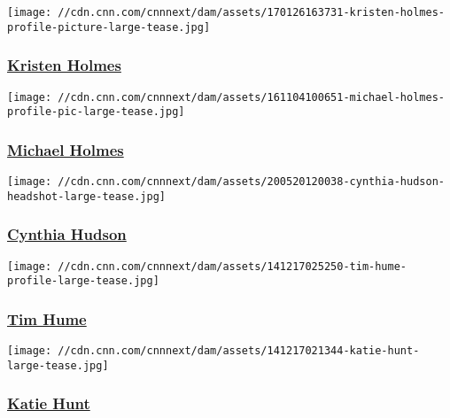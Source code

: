 \href{/profiles/kristen-holmes-bio}{}

\texttt{[image: //cdn.cnn.com/cnnnext/dam/assets/170126163731-kristen-holmes-profile-picture-large-tease.jpg]}

\hypertarget{kristen-holmes}{%
\subsubsection{\texorpdfstring{\href{/profiles/kristen-holmes-bio}{Kristen
Holmes}}{Kristen Holmes}}\label{kristen-holmes}}

\href{/profiles/michael-holmes-profile}{}

\texttt{[image: //cdn.cnn.com/cnnnext/dam/assets/161104100651-michael-holmes-profile-pic-large-tease.jpg]}

\hypertarget{michael-holmes}{%
\subsubsection{\texorpdfstring{\href{/profiles/michael-holmes-profile}{Michael
Holmes}}{Michael Holmes}}\label{michael-holmes}}

\href{/profiles/cynthia-hudson-profile}{}

\texttt{[image: //cdn.cnn.com/cnnnext/dam/assets/200520120038-cynthia-hudson-headshot-large-tease.jpg]}

\hypertarget{cynthia-hudson}{%
\subsubsection{\texorpdfstring{\href{/profiles/cynthia-hudson-profile}{Cynthia
Hudson}}{Cynthia Hudson}}\label{cynthia-hudson}}

\href{/profiles/tim-hume}{}

\texttt{[image: //cdn.cnn.com/cnnnext/dam/assets/141217025250-tim-hume-profile-large-tease.jpg]}

\hypertarget{tim-hume}{%
\subsubsection{\texorpdfstring{\href{/profiles/tim-hume}{Tim
Hume}}{Tim Hume}}\label{tim-hume}}

\href{/profiles/katie-hunt}{}

\texttt{[image: //cdn.cnn.com/cnnnext/dam/assets/141217021344-katie-hunt-large-tease.jpg]}

\hypertarget{katie-hunt}{%
\subsubsection{\texorpdfstring{\href{/profiles/katie-hunt}{Katie
Hunt}}{Katie Hunt}}\label{katie-hunt}}

